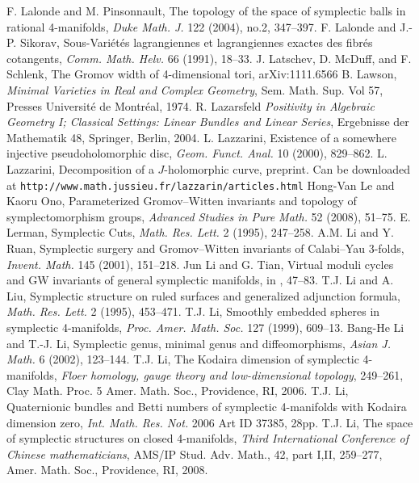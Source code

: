  F. Lalonde and M. Pinsonnault, The topology of the space of symplectic balls in rational 4-manifolds, \emph{Duke Math. J.} 122 (2004), no.2, 347--397.
 F. Lalonde and J.-P. Sikorav, Sous-Vari\'et\'es lagrangiennes et lagrangiennes exactes des fibr\'es cotangents, \emph{Comm. Math. Helv.} 66 (1991), 18--33.
 J. Latschev, D. McDuff, and F. Schlenk, The Gromov width of 4-dimensional tori, arXiv:1111.6566
 B. Lawson, \emph{Minimal Varieties in Real and Complex Geometry}, Sem. Math. Sup. Vol 57, Presses Universit\'e de Montr\'eal, 1974.
 R. Lazarsfeld \emph{Positivity in Algebraic Geometry I; Classical Settings: Linear Bundles and Linear Series}, Ergebnisse der Mathematik 48, Springer, Berlin, 2004.
 L. Lazzarini, Existence of a somewhere injective pseudoholomorphic disc, \emph{Geom. Funct. Anal.} 10 (2000), 829--862.
 L. Lazzarini, Decomposition of a $J$-holomorphic curve, preprint. Can be downloaded at \texttt{http://www.math.jussieu.fr/lazzarin/articles.html}
 Hong-Van Le and Kaoru Ono, Parameterized Gromov--Witten invariants and topology of symplectomorphism groups, \emph{Advanced Studies in Pure Math.} 52 (2008), 51--75.
 E. Lerman, Symplectic Cuts, \emph{Math. Res. Lett.} 2 (1995), 247--258.
 A.M. Li and Y. Ruan, Symplectic surgery and Gromov--Witten invariants of Calabi--Yau 3-folds, \emph{Invent. Math.} 145 (2001), 151--218.
 Jun Li and G. Tian, Virtual moduli cycles and GW invariants of general symplectic manifolds, in \cite{src-385}, 47--83.
 T.J. Li and A. Liu, Symplectic structure on ruled surfaces and generalized adjunction formula, \emph{Math. Res. Lett.} 2 (1995), 453--471.
 T.J. Li, Smoothly embedded spheres in symplectic 4-manifolds, \emph{Proc. Amer. Math. Soc.} 127 (1999), 609--13.
 Bang-He Li and T.-J. Li, Symplectic genus, minimal genus and diffeomorphisms, \emph{Asian J. Math.} 6 (2002), 123--144.
 T.J. Li, The Kodaira dimension of symplectic 4-manifolds, \emph{Floer homology, gauge theory and low-dimensional topology}, 249--261, Clay Math. Proc. 5 Amer. Math. Soc., Providence, RI, 2006.
 T.J. Li, Quaternionic bundles and Betti numbers of symplectic 4-manifolds with Kodaira dimension zero, \emph{Int. Math. Res. Not.} 2006 Art ID 37385, 28pp.
 T.J. Li, The space of symplectic structures on closed 4-manifolds, \emph{Third International Conference of Chinese mathematicians}, AMS/IP Stud. Adv. Math., 42, part I,II, 259--277, Amer. Math. Soc., Providence, RI, 2008.

